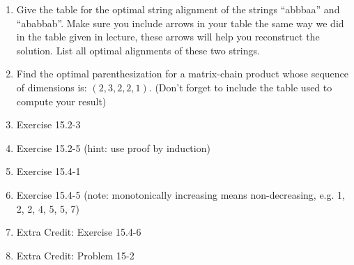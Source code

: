 \documentclass[11pt]{article}
\begin{document}
\begin{enumerate}
\item Give the table for the optimal string alignment of the strings
``abbbaa'' and ``ababbab''.  Make sure you include arrows in your
table the same way we did in the table given in lecture, these arrows
will help you reconstruct the solution.  List all optimal alignments
of these two strings.

\item Find the optimal parenthesization for a matrix-chain product
whose sequence of dimensions is: $(2,3,2,2,1)$.  (Don't forget to
include the table used to compute your result)

\item Exercise 15.2-3

\item Exercise 15.2-5 (hint: use proof by induction)

\item Exercise 15.4-1

\item Exercise 15.4-5 (note: monotonically increasing means
non-decreasing, e.g. 1, 2, 2, 4, 5, 5, 7)

\item Extra Credit: Exercise 15.4-6

\item Extra Credit: Problem 15-2

\end{enumerate}
\end{document}
